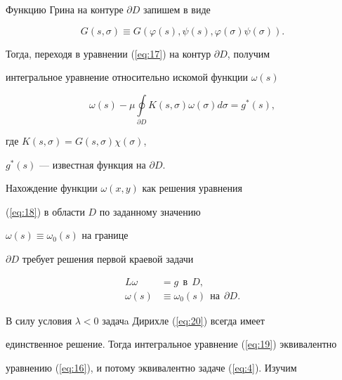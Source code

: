 Функцию Грина на контуре $\partial D$ запишем в виде 


$$


G ({s,\sigma }) \equiv G ({\varphi (s),\psi 


(s),\varphi (\sigma)\psi (\sigma)}).


$$


Тогда, переходя в уравнении (\ref{eq:17}) на контур $\partial D$, получим 


интегральное уравнение относительно искомой функции $\omega (s)$


\begin{equation}\label{eq:19}


\omega (s) - \mu \oint\limits_{\partial D} {K ({s,\sigma })}


\omega (\sigma)d\sigma=g^\ast (s),


\end{equation}


где $K ({s,\sigma })=G ({s,\sigma })\chi (\sigma)$,


$g^\ast (s)$ --- известная функция на $\partial D$.





Нахождение функции $\omega ({x,y})$ как решения уравнения 


(\ref{eq:18}) в области $D$ по заданному значению 


$\omega (s) \equiv \omega_0 (s)$ на границе


$\partial D$ требует решения первой краевой задачи


\begin{equation}\label{eq:20}


\begin{split}


L\omega &= g \ \ \text{в} \ \ D, \\


\omega (s) &\equiv \omega _0 (s) \ \ \text{на}\ \ \partial D.


\end{split}


\end{equation}





В силу условия $\lambda < 0$ задачa Дирихле (\ref{eq:20}) всегда имеет 


единственное решение. Тогда интегральное уравнение (\ref{eq:19}) эквивалентно


уравнению (\ref{eq:16}), и потому эквивалентно задаче (\ref{eq:4}). Изучим



